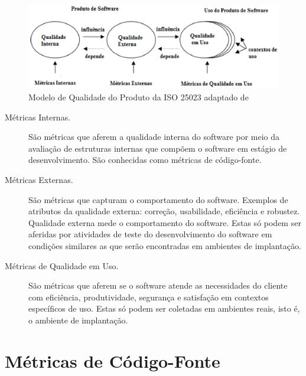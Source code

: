 				
\begin{figure}[h!]
\centering
\includegraphics[keepaspectratio=false,scale=1]{figuras/modelodequalidade.eps}
\caption{Modelo de Qualidade do Produto da ISO 25023 adaptado de 
}
\label{modelodequalidade}
\end{figure}
\FloatBarrier
	
\begin{description}
		\item[Métricas Internas.] 
		São métricas que aferem a qualidade interna do software por meio da 
		avaliação de estruturas internas que compõem o software em estágio de 
		desenvolvimento. São conhecidas como métricas de código-fonte.

		\item[Métricas Externas.]
		São métricas que capturam o comportamento do software. Exemplos de 
		atributos da qualidade externa: correção, usabilidade, eficiência e 
		robustez. Qualidade externa mede o comportamento do software. Estas só 
		podem ser aferidas por atividades de teste do desenvolvimento do 
		software em condições similares as que serão encontradas em ambientes de
		implantação.

		\item[Métricas de Qualidade em Uso.]
		 São métricas que aferem se o software atende as necessidades do cliente
		 com eficiência, produtividade, segurança e satisfação em contextos 
		 específicos de uso. Estas só podem ser coletadas em ambientes reais, 
		 isto é, o ambiente de implantação.
			 
\end{description}
		
				

\section {Métricas de Código-Fonte}
\label {Métricas de Código-Fonte}

